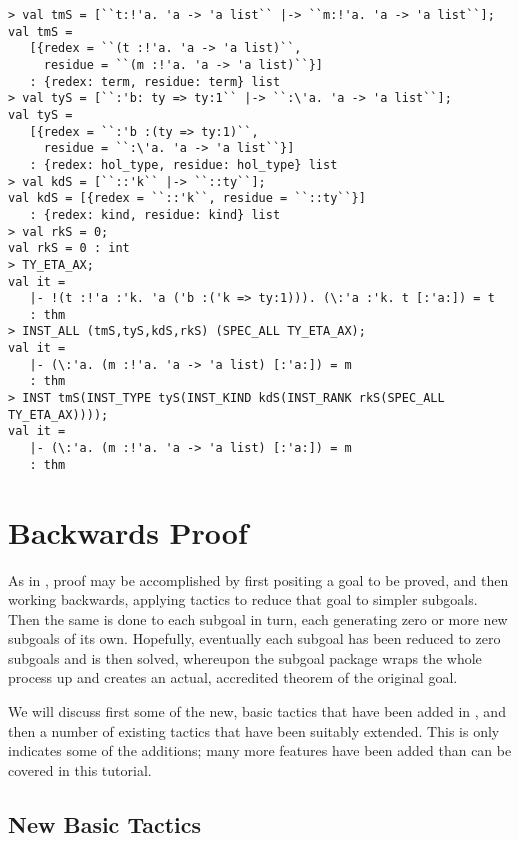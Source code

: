 \begin{session}
\begin{verbatim}
> val tmS = [``t:!'a. 'a -> 'a list`` |-> ``m:!'a. 'a -> 'a list``];
val tmS =
   [{redex = ``(t :!'a. 'a -> 'a list)``,
     residue = ``(m :!'a. 'a -> 'a list)``}]
   : {redex: term, residue: term} list
> val tyS = [``:'b: ty => ty:1`` |-> ``:\'a. 'a -> 'a list``];
val tyS =
   [{redex = ``:'b :(ty => ty:1)``,
     residue = ``:\'a. 'a -> 'a list``}]
   : {redex: hol_type, residue: hol_type} list
> val kdS = [``::'k`` |-> ``::ty``];
val kdS = [{redex = ``::'k``, residue = ``::ty``}]
   : {redex: kind, residue: kind} list
> val rkS = 0;
val rkS = 0 : int
> TY_ETA_AX;
val it =
   |- !(t :!'a :'k. 'a ('b :('k => ty:1))). (\:'a :'k. t [:'a:]) = t
   : thm
> INST_ALL (tmS,tyS,kdS,rkS) (SPEC_ALL TY_ETA_AX);
val it =
   |- (\:'a. (m :!'a. 'a -> 'a list) [:'a:]) = m
   : thm
> INST tmS(INST_TYPE tyS(INST_KIND kdS(INST_RANK rkS(SPEC_ALL TY_ETA_AX))));
val it =
   |- (\:'a. (m :!'a. 'a -> 'a list) [:'a:]) = m
   : thm
\end{verbatim}
\end{session}

\section{Backwards Proof}

As in \HOL{}, proof may be accomplished by first positing a goal to be proved,
and then working backwards, applying tactics to reduce that goal to simpler
subgoals. Then the same is done to each subgoal in turn, each generating zero
or more new subgoals of its own. Hopefully, eventually each subgoal
has been reduced to zero subgoals and is then solved,
whereupon the subgoal package wraps the whole process up and creates an actual,
accredited \HOLW{} theorem of the original goal.

We will discuss first some of the new, basic tactics that have been added
in \HOLW, and then a number of existing tactics that have been suitably
extended.
This is only indicates some of the \HOLW{} additions;
many more features have been added than can be covered in this tutorial.

\subsection{New Basic Tactics}

